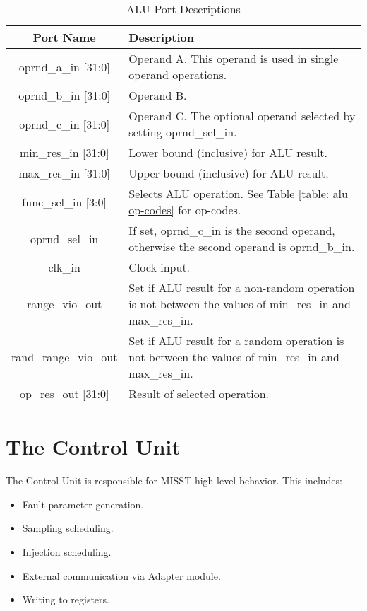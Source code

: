 \documentclass[]{report}
\begin{document}
\begin{table}[h]
	\centering
	\caption{ALU Port Descriptions}
	\label{table:alu port desc}
	\begin{tabular}{|c|p{}|}
		\hline 
		Port Name & Description \\ 
		\hline 
		oprnd\_a\_in [31:0] & Operand A. This operand is used in single operand operations.\\
		\hline
		oprnd\_b\_in [31:0] & Operand B.\\
		\hline
		oprnd\_c\_in [31:0] & Operand C. The optional operand selected by setting oprnd\_sel\_in.\\
		\hline
		min\_res\_in [31:0] & Lower bound (inclusive) for ALU result.\\
		\hline
		max\_res\_in [31:0] & Upper bound (inclusive) for ALU result.\\
		\hline
		func\_sel\_in [3:0] & Selects ALU operation. See Table \ref{table: alu op-codes} for op-codes.\\
		\hline
		oprnd\_sel\_in & If set, oprnd\_c\_in is the second operand, otherwise the second operand is oprnd\_b\_in.\\
		\hline
		clk\_in & Clock input.\\
		\hline
		range\_vio\_out & Set if ALU result for a non-random operation is not between the values of min\_res\_in and max\_res\_in.\\
		\hline
		rand\_range\_vio\_out & Set if ALU result for a random operation is not between the values of min\_res\_in and max\_res\_in.\\
		\hline
		op\_res\_out [31:0] & Result of selected operation.\\
		\hline
	\end{tabular}
\end{table}

\chapter{The Control Unit}

The Control Unit is responsible for MISST high level behavior. This includes:
\begin{itemize}
	\item Fault parameter generation.
	\item Sampling scheduling.
	\item Injection scheduling.
	\item External communication via Adapter module.
	\item Writing to registers.
\end{itemize}
\end{document}

